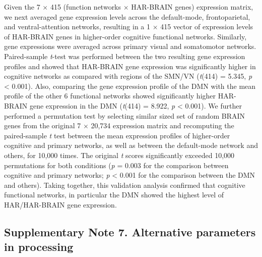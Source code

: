 \begin{refsection}
Given the 7 $ \times $  415 (function networks $ \times $  HAR-BRAIN genes) expression matrix, we next averaged gene expression levels across the default-mode, frontoparietal, and ventral-attention networks, resulting in a 1 $ \times $  415 vector of expression levels of HAR-BRAIN genes in higher-order cognitive functional networks. Similarly, gene expressions were averaged across primary visual and somatomotor networks. Paired-sample \textit{t}-test was performed between the two resulting gene expression profiles and showed that HAR-BRAIN gene expression was significantly higher in cognitive networks as compared with regions of the SMN/VN (\textit{t}(414) = 5.345, \textit{p} < 0.001). Also, comparing the gene expression profile of the DMN with the mean profile of the other 6 functional networks showed significantly higher HAR-BRAIN gene expression in the DMN (\textit{t}(414) = 8.922, \textit{p} < 0.001). We further performed a permutation test by selecting similar sized set of random BRAIN genes from the original 7 $ \times $  20,734 expression matrix and recomputing the paired-sample \textit{t} test between the mean expression profiles of higher-order cognitive and primary networks, as well as between the default-mode network and others, for 10,000 times. The original \textit{t} scores significantly exceeded 10,000 permutations for both conditions (\textit{p} = 0.003 for the comparison between cognitive and primary networks; \textit{p} < 0.001 for the comparison between the DMN and others). Taking together, this validation analysis confirmed that cognitive functional networks, in particular the DMN showed the highest level of HAR/HAR-BRAIN gene expression.

\subsection*{Supplementary Note 7. Alternative parameters in processing}

\end{refsection}
